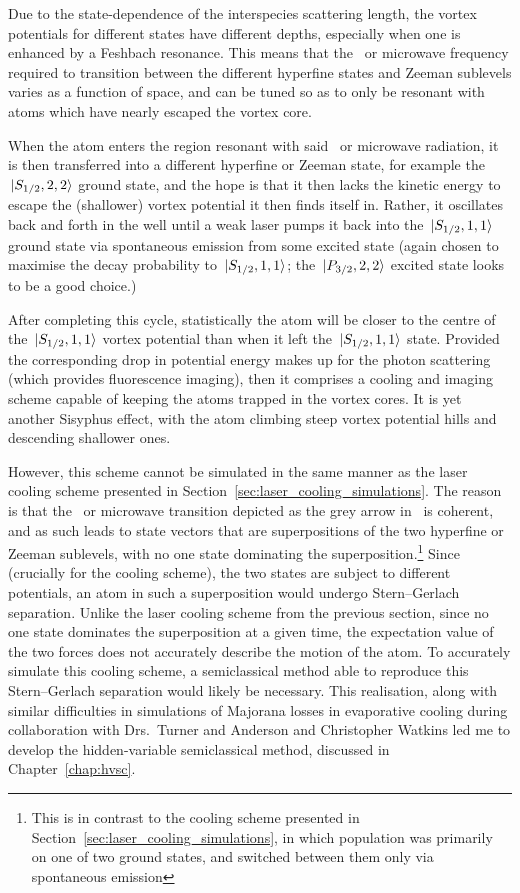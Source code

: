 Due to the state-dependence of the interspecies scattering length, the vortex potentials for different states have different depths, especially when one is enhanced by a Feshbach resonance. This means that the \rf\ or microwave frequency required to transition between the different hyperfine states and Zeeman sublevels varies as a function of space, and can be tuned so as to only be resonant with atoms which have nearly escaped the vortex core.

When the atom enters the region resonant with said \rf\ or microwave radiation, it is then transferred into a different hyperfine or Zeeman state, for example the $\ket{S_{1/2}, 2,2}$ ground state, and the hope is that it then lacks the kinetic energy to escape the (shallower) vortex potential it then finds itself in. Rather, it oscillates back and forth in the well until a weak laser pumps it back into the $\ket{S_{1/2}, 1,1}$ ground state via spontaneous emission from some excited state (again chosen to maximise the decay probability to $\ket{S_{1/2}, 1,1}$; the $\ket{P_{3/2}, 2,2}$ excited state looks to be a good choice.)

After completing this cycle, statistically the atom will be closer to the centre of the  $\ket{S_{1/2}, 1,1}$ vortex potential than when it left the $\ket{S_{1/2}, 1,1}$ state. Provided the corresponding drop in potential energy makes up for the photon scattering (which provides fluorescence imaging), then it comprises a cooling and imaging scheme capable of keeping the atoms trapped in the vortex cores. It is yet another Sisyphus effect, with the atom climbing steep vortex potential hills and descending shallower ones.

However, this scheme cannot be simulated in the same manner as the laser cooling scheme presented in Section~\ref{sec:laser_cooling_simulations}. The reason is that the \rf\ or microwave transition depicted as the grey arrow in~ is coherent, and as such leads to state vectors that are superpositions of the two hyperfine or Zeeman sublevels, with no one state dominating the superposition.\footnote{This is in contrast to the cooling scheme presented in Section~\ref{sec:laser_cooling_simulations}, in which population was primarily on one of two ground states, and switched between them only via spontaneous emission} Since (crucially for the cooling scheme), the two states are subject to different potentials, an atom in such a superposition would undergo Stern--Gerlach separation. Unlike the laser cooling scheme from the previous section, since no one state dominates the superposition at a given time, the expectation value of the two forces does not accurately describe the motion of the atom. To accurately simulate this cooling scheme, a semiclassical method able to reproduce this Stern--Gerlach separation would likely be necessary. This realisation, along with similar difficulties in simulations of Majorana losses in evaporative cooling during collaboration with Drs.~Turner and Anderson and Christopher Watkins led me to develop the hidden-variable semiclassical method, discussed in Chapter~\ref{chap:hvsc}.

